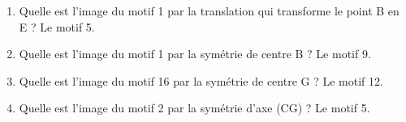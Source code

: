 \begin{enumerate}
	\begin{enumerate}
		\item Quelle est l'image du motif 1 par la translation qui transforme le point B en E ? Le motif 5.
		\item Quelle est l'image du motif 1 par la symétrie de centre B ? Le motif 9.
		\item Quelle est l'image du motif 16 par la symétrie de centre G ? Le motif 12.
		\item Quelle est l'image du motif 2 par la symétrie d'axe (CG) ? Le motif 5.
	\end{enumerate}	
\end{enumerate}






		
		
		
		
